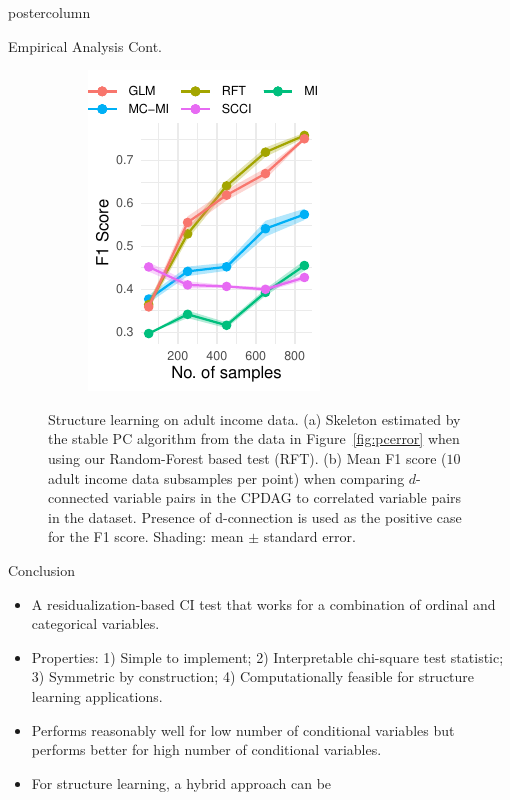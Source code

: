\documentclass{beamer}
\begin{document}
\begin{frame}
\begin{columns}
\begin{column}{0.33\textwidth}
\begin{beamercolorbox}[center]{postercolumn}
\begin{minipage}{.98\textwidth}
{\begin{myblock}{Empirical Analysis Cont.}
\begin{figure}
\begin{subfigure}[b]{0.55\textwidth}
				\caption{}
				\label{fig:sl_adult_model}
			\end{subfigure}%
			\begin{subfigure}[b]{0.4\textwidth}
				\includegraphics[scale=2.7]{../in_person/imgs/adult_F1.pdf}
				\caption{}
				\label{fig:sl_adult}
			\end{subfigure}
			\caption{Structure learning on adult income data. (a) Skeleton
				estimated by the stable PC algorithm from the data in
				Figure~\ref{fig:pcerror} when using our Random-Forest based
				test (RFT). (b) Mean F1 score ($10$ adult income data subsamples
				per point)
				when comparing $d$-connected variable pairs in the CPDAG to
				correlated variable pairs in the dataset. Presence of
				d-connection is used as the positive case for the
				F1 score. Shading: mean $\pm$ standard
				error.}
		\end{figure}
	\end{myblock}\vfill
	\begin{myblock}{Conclusion}
		\begin{itemize}
			\item A residualization-based CI test that works for a
				combination of ordinal and categorical
				variables.
			\item Properties: 1) Simple to implement; 2)
				Interpretable chi-square test statistic; 3)
				Symmetric by construction; 4) Computationally
				feasible for structure learning applications.
			\item Performs reasonably well for low number of
				conditional variables but performs better for
				high number of conditional variables.
			\item For structure learning, a hybrid approach can be

\end{itemize}
\end{myblock}}
\end{minipage}
\end{beamercolorbox}
\end{column}
\end{columns}
\end{frame}
\end{document}
